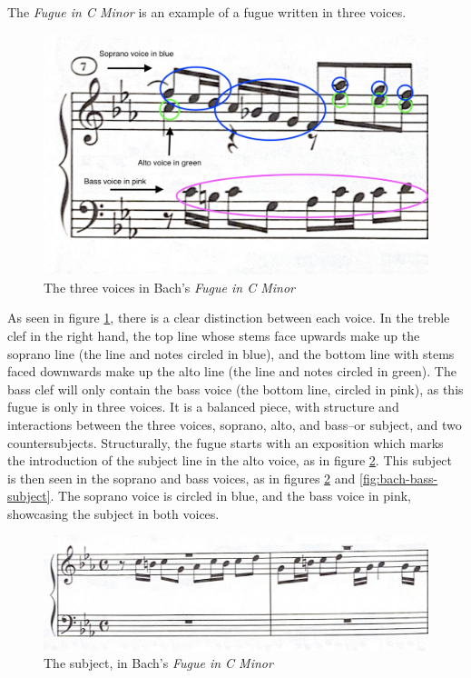The \textit{Fugue in C Minor} is an example of a fugue written in three voices.
\begin{figure}
    \centering
    \includegraphics[width=.5\textwidth]{figures/fugue-three-voices.png}
    \caption{The three voices in Bach's \textit{Fugue in C Minor}}
    \label{fig:bach-fugue-three-voices}
\end{figure}
As seen in figure \ref{fig:bach-fugue-three-voices}\autocite{Henle_2009}, there is a clear distinction between each voice. In the treble clef in the right hand, the top line whose stems face upwards make up the soprano line (the line and notes circled in blue), and the bottom line with stems faced downwards make up the alto line (the line and notes circled in green). The bass clef will only contain the bass voice (the bottom line, circled in pink), as this fugue is only in three voices. It is a balanced piece, with structure and interactions between the three voices, soprano, alto, and bass--or subject, and two countersubjects. Structurally, the fugue starts with an exposition which marks the introduction of the subject line in the alto voice, as in figure \ref{fig:bach-fugue-subject}\autocite{Henle_2009}. This subject is then seen in the soprano and bass voices, as in figures \ref{fig:bach-fugue-subject}\autocite{Henle_2009} and \ref{fig:bach-bass-subject}\autocite{Henle_2009}. The soprano voice is circled in blue, and the bass voice in pink, showcasing the subject in both voices.
\begin{figure}
    \centering
    \includegraphics[width=\textwidth]{figures/bach-fugue-subject.png}
    \caption{The subject, in Bach's \textit{Fugue in C Minor}}
    \label{fig:bach-fugue-subject}
\end{figure}

